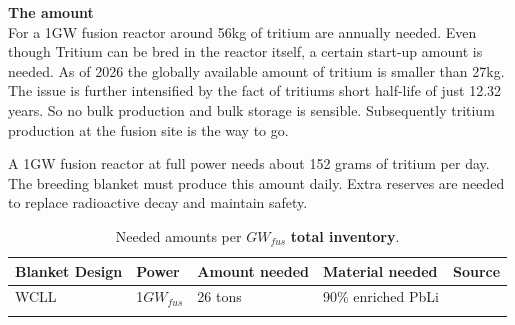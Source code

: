     \textbf{The amount}\\
    For a 1GW fusion reactor around 56kg of tritium are annually needed. Even though Tritium can be bred in the reactor itself, a certain start-up amount is needed.
    As of 2026 the globally available amount of tritium is smaller than 27kg. The issue is further intensified by the fact of tritiums short half-life of just 12.32 years. So no bulk production and bulk storage is sensible. \cite{wimmersNuclearPowerTechnology2026} Subsequently tritium production at the fusion site is the way to go. \cite{AcostaFlexer2018}


    A 1GW fusion reactor at full power needs about 152 grams of tritium per day. The breeding blanket must produce this amount daily. Extra reserves are needed to replace radioactive decay and maintain safety. \cite{IAEA2018FusionDemo}

    \begin{table}[h!]
        \centering
        \caption{Needed amounts per $GW_{fus}$ \textbf{total inventory}.}
        \begin{tabular}{lllll}
        Blanket Design & Power & Amount needed & Material needed    & Source \\
        \midrule
        WCLL           & 1$GW_{fus}$ & 26 tons       & 90\% enriched PbLi &  \cite{giegerich2019lithium6} \\
                       & &               &                    &
        \end{tabular}
        \label{tab:amount_Li_inventory}
    \end{table}

